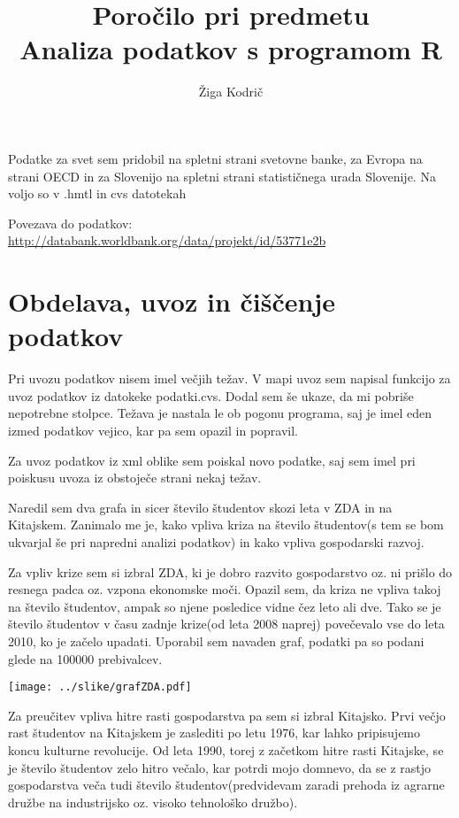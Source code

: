 \documentclass[11pt,a4paper]{article}
\begin{document}
\title{Poročilo pri predmetu \\
Analiza podatkov s programom R}
\author{Žiga Kodrič}

Podatke za svet sem pridobil na spletni strani svetovne banke, za Evropa na strani OECD in za Slovenijo na spletni strani statističnega urada Slovenije. Na voljo so v .hmtl in cvs datotekah

Povezava do podatkov: \url{http://databank.worldbank.org/data/projekt/id/53771e2b}
\section{Obdelava, uvoz in čiščenje podatkov}
Pri uvozu podatkov nisem imel večjih težav. V mapi uvoz sem napisal funkcijo za uvoz podatkov iz datokeke podatki.cvs. Dodal sem še ukaze, da mi pobriše nepotrebne stolpce. Težava je nastala le ob pogonu programa, saj je imel eden izmed podatkov vejico, kar pa sem opazil in popravil. 

Za uvoz podatkov iz xml oblike sem poiskal novo podatke, saj sem imel pri poiskusu uvoza iz obstoječe strani nekaj težav. 

Naredil sem dva grafa in sicer število študentov skozi leta v ZDA in na Kitajskem. Zanimalo me je, kako vpliva kriza na število študentov(s tem se bom ukvarjal še pri napredni analizi podatkov) in kako vpliva gospodarski razvoj.

Za vpliv krize sem si izbral ZDA, ki je dobro razvito gospodarstvo oz. ni prišlo do resnega padca oz. vzpona ekonomske moči. Opazil sem, da kriza ne vpliva takoj na število študentov, ampak so njene posledice vidne čez leto ali dve. Tako se je število študentov v času zadnje krize(od leta 2008 naprej) povečevalo vse do leta 2010, ko je začelo upadati. Uporabil sem navaden graf, podatki pa so podani glede na 100000 prebivalcev. 

\texttt{[image: ../slike/grafZDA.pdf]}

Za preučitev vpliva hitre rasti gospodarstva pa sem si izbral Kitajsko. Prvi večjo rast študentov na Kitajskem je zaslediti po letu 1976, kar lahko pripisujemo koncu kulturne revolucije. Od leta 1990, torej z začetkom hitre rasti Kitajske, se je število študentov zelo hitro večalo, kar potrdi mojo domnevo, da se z rastjo gospodarstva veča tudi število študentov(predvidevam zaradi prehoda iz agrarne družbe na industrijsko oz. visoko tehnološko družbo). 
\end{document}
